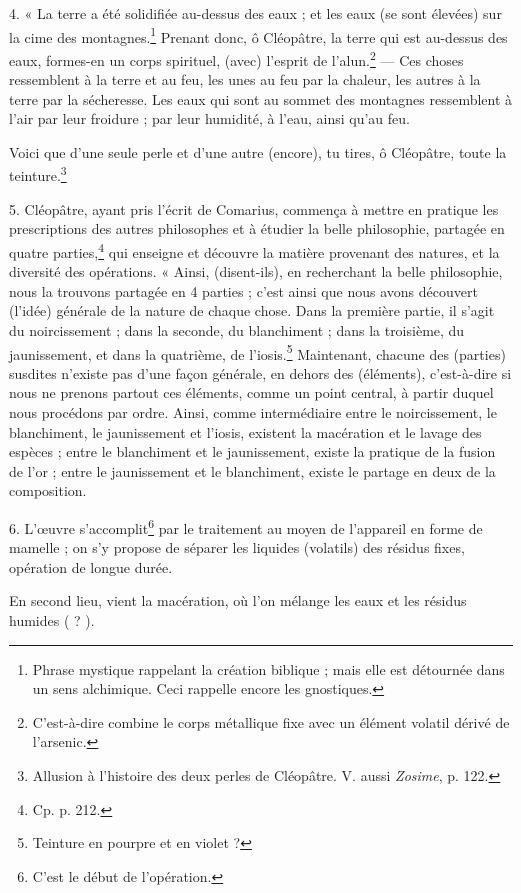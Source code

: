 \documentclass[a4paper, 11pt, oneside, polutonikogreek, french]{article}
\begin{document}
4. « La terre a été solidifiée au-dessus des eaux ; et les eaux (se sont élevées) sur la cime des montagnes.\footnote{Phrase mystique rappelant la création biblique ; mais elle est détournée dans un sens alchimique. Ceci rappelle encore les gnostiques.} Prenant donc, ô Cléopâtre, la terre qui est au-dessus des eaux, formes-en un corps spirituel, (avec) l'esprit de l'alun.\footnote{C'est-à-dire combine le corps métallique fixe avec un élément volatil dérivé de l'arsenic.} --- Ces choses ressemblent à la terre et au feu, les unes au feu par la chaleur, les autres à la terre par la sécheresse. Les eaux qui sont au sommet des montagnes ressemblent à l'air par leur froidure ; par leur humidité, à l'eau, ainsi qu'au feu.

Voici que d'une seule perle et d'une autre (encore), tu tires, ô Cléopâtre, toute la teinture.\footnote{Allusion à l'histoire des deux perles de Cléopâtre. V. aussi \emph{Zosime}, p. 122.}

5. Cléopâtre, ayant pris l'écrit de Comarius, commença à mettre en pratique les prescriptions des autres philosophes et à étudier la belle philosophie, partagée en quatre parties,\footnote{Cp. p. 212.} qui enseigne et découvre la matière provenant des natures, et la diversité des opérations. « Ainsi, (disent-ils), en recherchant la belle philosophie, nous la trouvons partagée en 4 parties ; c'est ainsi que nous avons découvert (l'idée) générale de la nature de chaque chose. Dans la première partie, il s'agit du noircissement ; dans la seconde, du blanchiment ; dans la troisième, du jaunissement, et dans la quatrième, de l'iosis.\footnote{Teinture en pourpre et en violet ?} Maintenant, chacune des (parties) susdites n'existe pas d'une façon générale, en dehors des (éléments), c'est-à-dire si nous ne prenons partout ces éléments, comme un point central, à partir duquel nous procédons par ordre. Ainsi, comme intermédiaire entre le noircissement, le blanchiment, le jaunissement et l'iosis, existent la macération et le lavage des espèces ; entre le blanchiment et le jaunissement, existe la pratique de la fusion de l'or ; entre le jaunissement et le blanchiment, existe le partage en deux de la composition.

6. L'œuvre s'accomplit\footnote{C'est le début de l'opération.} par le traitement au moyen de l'appareil en forme de mamelle ; on s'y propose de séparer les liquides (volatils) des résidus fixes, opération de longue durée.

En second lieu, vient la macération, où l'on mélange les eaux et les résidus humides ( ? ).
\end{document}
